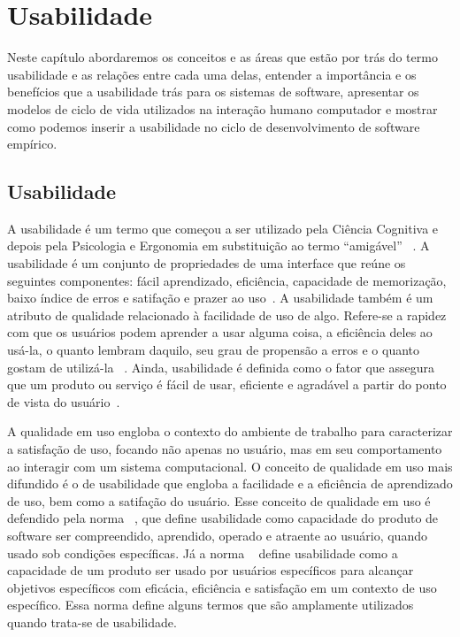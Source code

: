 \chapter{Usabilidade}

Neste capítulo abordaremos os conceitos e as áreas que estão por trás do termo usabilidade e as relações entre cada uma delas, entender a importância e os benefícios que a usabilidade trás para os sistemas de software, apresentar os modelos de ciclo de vida utilizados na interação humano computador e mostrar como podemos inserir a usabilidade no ciclo de desenvolvimento de software empírico.

\section {Usabilidade}

A usabilidade é um termo que começou a ser utilizado pela Ciência Cognitiva e depois pela Psicologia e Ergonomia em substituição ao termo ``amigável'' ~\cite{dias2006}.
% 
A usabilidade é um conjunto de propriedades de uma interface que reúne os seguintes componentes: fácil aprendizado, eficiência, capacidade de memorização, baixo índice de erros e satifação e prazer ao uso~\cite{nielsen1994}.
%
A usabilidade também é um atributo de qualidade relacionado à facilidade de uso de algo. Refere-se a rapidez com que os usuários podem aprender a usar alguma coisa, a eficiência deles ao usá-la, o quanto lembram daquilo, seu grau de propensão a erros e o quanto gostam de utilizá-la ~\cite{nielsen2007}. 
%
Ainda, usabilidade é definida como o fator que assegura que um produto ou serviço é fácil de usar, eficiente e agradável a partir do ponto de vista do usuário~\cite{preece2007}.


A qualidade em uso engloba o contexto do ambiente de trabalho para caracterizar a satisfação de uso, focando não apenas no usuário, mas em seu comportamento ao interagir com um sistema computacional.
%
O conceito de qualidade em uso mais difundido é o de usabilidade que engloba a facilidade e a eficiência de aprendizado de uso, bem como a satifação do usuário.
%
Esse conceito de qualidade em uso é defendido pela norma ~, que define usabilidade como  capacidade do produto de software ser compreendido, aprendido, operado e atraente ao usuário, quando usado sob condições específicas.
%
Já a norma ~ define usabilidade como a capacidade de um produto ser usado por usuários específicos para alcançar objetivos específicos com eficácia, eficiência e satisfação em um contexto de uso específico. Essa norma define alguns termos que são amplamente utilizados quando trata-se de usabilidade.

